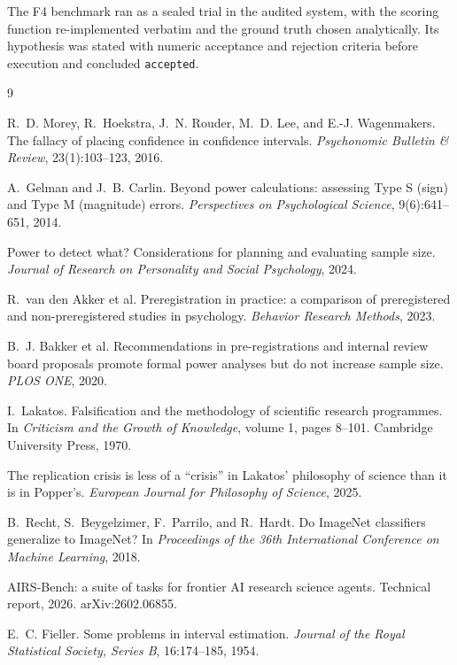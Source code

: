 \documentclass[10pt,twocolumn,letterpaper]{article}
\newcommand{\code}[1]{\texttt{#1}}
\begin{document}
The F4 benchmark ran as a sealed trial in the audited system, with the scoring function
re-implemented verbatim and the ground truth chosen analytically. Its hypothesis was stated with
numeric acceptance and rejection criteria before execution and concluded \code{accepted}.

\begin{thebibliography}{9}

R.~D. Morey, R.~Hoekstra, J.~N. Rouder, M.~D. Lee, and E.-J. Wagenmakers.
The fallacy of placing confidence in confidence intervals.
\emph{Psychonomic Bulletin \& Review}, 23(1):103--123, 2016.

A.~Gelman and J.~B. Carlin.
Beyond power calculations: assessing Type S (sign) and Type M (magnitude) errors.
\emph{Perspectives on Psychological Science}, 9(6):641--651, 2014.

Power to detect what? Considerations for planning and evaluating sample size.
\emph{Journal of Research on Personality and Social Psychology}, 2024.

R.~van den Akker et al.
Preregistration in practice: a comparison of preregistered and non-preregistered studies
in psychology.
\emph{Behavior Research Methods}, 2023.

B.~J. Bakker et al.
Recommendations in pre-registrations and internal review board proposals promote
formal power analyses but do not increase sample size.
\emph{PLOS ONE}, 2020.

I.~Lakatos.
Falsification and the methodology of scientific research programmes.
In \emph{Criticism and the Growth of Knowledge}, volume 1, pages 8--101.
Cambridge University Press, 1970.

The replication crisis is less of a ``crisis'' in Lakatos' philosophy of science
than it is in Popper's.
\emph{European Journal for Philosophy of Science}, 2025.

B.~Recht, S.~Beygelzimer, F.~Parrilo, and R.~Hardt.
Do ImageNet classifiers generalize to ImageNet?
In \emph{Proceedings of the 36th International Conference on Machine Learning}, 2018.

AIRS-Bench: a suite of tasks for frontier AI research science agents.
Technical report, 2026. arXiv:2602.06855.

E.~C. Fieller.
Some problems in interval estimation.
\emph{Journal of the Royal Statistical Society, Series B}, 16:174--185, 1954.


\end{thebibliography}
\end{document}
